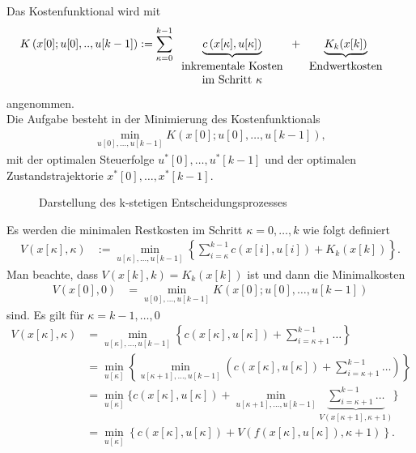 Das Kostenfunktional wird mit
\begin{align}
	K\left(x[0];u[0],..,u[k-1] \right) & := \sum\limits_{\kappa=0}^{k-1}\underbrace{c\left(x[\kappa],u[\kappa] \right)}_{\begin{tabular}{c}inkrementale
	Kosten\\ im Schritt $\kappa$\end{tabular}} + \underbrace{K_k(x[k])}_{\begin{tabular}{c}Endwertkosten\end{tabular}}
\end{align}
angenommen.\\
Die Aufgabe besteht in der Minimierung des Kostenfunktionals
\begin{align}
	\min\limits_{u[0],\ldots,u[k-1]}K\left(x[0];u[0],\ldots,u[k-1]\right),
\end{align}
mit der optimalen Steuerfolge $u^{\ast} [0], \ldots , u^{\ast} [k-1]$ und der optimalen Zustandstrajektorie $x^{\ast} [0], \ldots , x^{\ast} [k-1]$.
\begin{figure}[htb]
	\centering
	
	\caption{Darstellung des k-stetigen Entscheidungsprozesses}
	\label{fig:kap_3_entscheidungsprozess}
\end{figure}
Es werden die minimalen Restkosten im Schritt $\kappa=0,\ldots,k$ wie folgt definiert 
\begin{align}
	V\left(x[\kappa],\kappa \right) & := \min\limits_{u[\kappa],\ldots,u[k-1]}\left\{\sum\limits_{i=\kappa}^{k-1} c\left(x[i],u[i] \right) +
	K_k(x[k])\right\}.
\end{align}
Man beachte, dass $V\left(x[k],k\right)=K_k(x[k])$ ist und dann die Minimalkosten
\begin{align*}
	V\left(x[0],0 \right) & = \min\limits_{u[0],\ldots,u[k-1]} K\left(x[0];u[0],\ldots,u[k-1] \right)
\end{align*}
sind. Es gilt für $\kappa=k-1,\ldots,0$
\begin{align}
	V\left(x[\kappa],\kappa \right) & = \min\limits_{u[\kappa],\ldots,u[k-1]}\left\{ c\left(x[\kappa],u[\kappa] \right)+\sum\limits_{i=\kappa+1}^{k-1} \ldots
	\right\}\\
	& = \min\limits_{u[\kappa]}\left\{\min\limits_{u[\kappa + 1],\ldots,u[k-1]}\left(c\left(x[\kappa],u[\kappa] \right) + \sum\limits_{i=\kappa +
	1}^{k-1} \ldots\right) \right\}\\
	& = \min\limits_{u[\kappa]}\Bigg\{c\left(x[\kappa], u[\kappa] \right) + \min\limits_{u[\kappa
	+1],\ldots,u[k-1]}\underbrace{\sum\limits_{i=\kappa+1}^{k-1}\ldots}_{V\left(x[\kappa+1],\kappa+1 \right)} \Bigg\}\\
	& = \min\limits_{u[\kappa]}\left\{c\left(x[\kappa],u[\kappa] \right)+V\left(f\left(x[\kappa],u[\kappa] \right),\kappa+1 \right)
	\right\}.\label{eqn:kap_3_dp}
\end{align}
